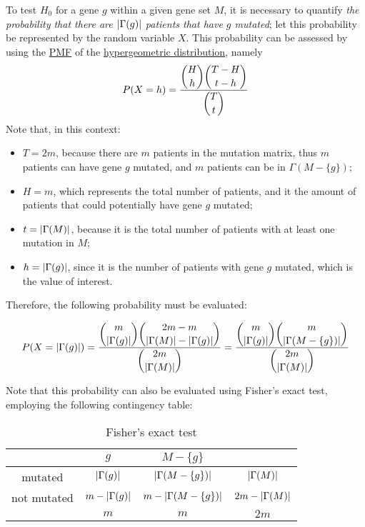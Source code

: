 To test $H_0$ for a gene $g$ within a given gene set $M$, it is necessary to quantify \textit{the probability that there are $\left|\Gamma(g)\right|$ patients that have $g$ mutated}; let this probability be represented by the random variable $X$. This probability can be assessed by using the \href{https://en.wikipedia.org/wiki/Probability_mass_function}{PMF} of the \href{https://en.wikipedia.org/wiki/Hypergeometric_distribution}{hypergeometric distribution}, namely $$P(X = h) = \dfrac{\dbinom{H}{h}\dbinom{T - H}{t - h}}{\dbinom{T}{t}}$$ Note that, in this context:

\begin{itemize}
    \item $T = 2m$, because there are $m$ patients in the mutation matrix, thus $m$ patients can have gene $g$ mutated, and $m$ patients can be in $\Gamma(M - \{g\})$;
    \item $H = m$, which represents the total number of patients, and it the amount of patients that could potentially have gene $g$ mutated;
    \item $t = \left|\Gamma(M)\right|$, because it is the total number of patients with at least one mutation in $M$;
    \item $h = \left|\Gamma(g)\right|$, since it is the number of patients with gene $g$ mutated, which is the value of interest.
\end{itemize}

Therefore, the following probability must be evaluated:

\begin{equation}
    P(X = \left|\Gamma(g)\right|) = \dfrac{\dbinom{m}{\left|\Gamma(g)\right|}\dbinom{2m - m}{\left|\Gamma(M)\right| - \left|\Gamma(g)\right|}}{\dbinom{2m}{\left|\Gamma(M)\right|}} = \dfrac{\dbinom{m}{\left|\Gamma(g)\right|}\dbinom{m}{\left|\Gamma(M - \{g\})\right|}}{\dbinom{2m}{\left|\Gamma(M)\right|}}
\end{equation}

Note that this probability can also be evaluated using Fisher's exact test, employing the following contingency table:

\begin{table}[H]
    \centering
    \begin{tabular}{c|c|c|c}
              & $g$ & $M - \{g\}$ & \\
        \hline
        mutated & $\left|\Gamma(g)\right|$ & $\left|\Gamma(M - \{g\})\right|$ & $\left|\Gamma(M)\right|$ \\
        \hline
        not mutated & $m - \left|\Gamma(g)\right|$ & $m - \left|\Gamma(M - \{g\})\right|$ & $2m - \left|\Gamma(M)\right|$ \\
        \hline
              & $m$ & $m$ & $2m$
    \end{tabular}
    \caption{Fisher's exact test}
\end{table}

